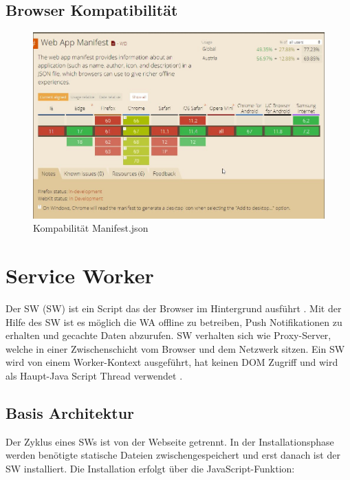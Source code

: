 \subsection{Browser Kompatibilität}
\begin{figure}[h]
	\centering
	\includegraphics[width=14cm]{BilderAllgemein/BrowserManifest}\medskip
	\caption{Kompabilität Manifest.json \cite{BrowserSupport}}
	\label{fig:BrowserManifest}
\end{figure}

\newpage
\section{Service Worker}
Der \acl{SW} (\acs{SW}) ist ein Script das der Browser im Hintergrund ausführt \cite{ServiceWorkerRegistration}. Mit der Hilfe des \acs{SW} ist es möglich die \acs{WA} offline zu betreiben, Push Notifikationen zu erhalten und gecachte Daten abzurufen. \acs{SW} verhalten sich wie Proxy-Server, welche in einer Zwischenschicht vom Browser und dem Netzwerk sitzen. 
Ein \acs{SW} wird von einem Worker-Kontext \cite{Worker} ausgeführt, hat keinen DOM Zugriff und wird als Haupt-Java Script Thread verwendet \cite{ServiceWorker}.

\subsection{Basis Architektur}
Der Zyklus eines \acs{SW}s ist von der Webseite getrennt.
In der Installationsphase werden benötigte statische Dateien zwischengespeichert und erst danach ist der \acs{SW} installiert. Die Installation erfolgt über die JavaScript-Funktion:

